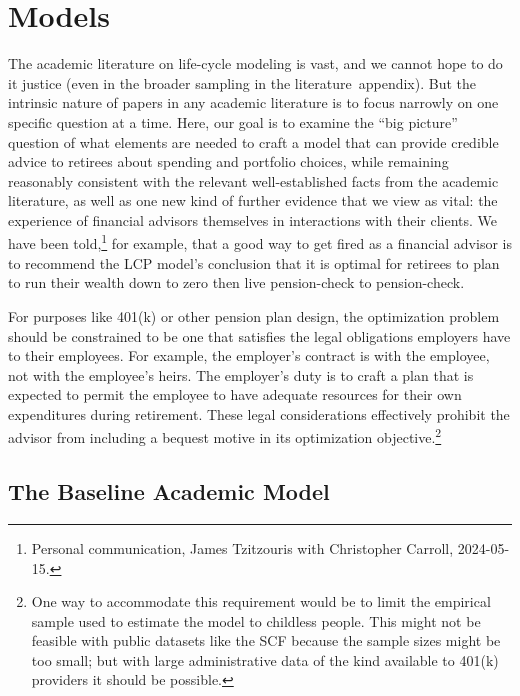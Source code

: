 \documentclass{article}
\begin{document}
\section{Models}

The academic literature on life-cycle modeling is vast, and we cannot hope to do it justice (even in the broader sampling in the literature~appendix).
But the intrinsic nature of papers in any academic literature is to focus narrowly on one specific question at a time.
Here, our goal is to examine the ``big picture'' question of what elements are needed to craft a model that can provide credible advice to retirees about spending and portfolio choices, while remaining reasonably consistent with the relevant well-established facts from the academic literature, as well as one new kind of further evidence that we view as vital: the experience of financial advisors themselves in interactions with their clients.
We have been told,\footnote{Personal communication, James Tzitzouris with Christopher Carroll, 2024-05-15.} for example, that a good way to get fired as a financial advisor is to recommend the LCP model's conclusion that it is optimal for retirees to plan to run their wealth down to zero then live pension-check to pension-check.

For purposes like 401(k) or other pension plan design, the optimization problem should be constrained to be one that satisfies the legal obligations employers have to their employees.
For example, the employer's contract is with the employee, not with the employee's heirs.
The employer's duty is to craft a plan that is expected to permit the employee to have adequate resources for their own expenditures during retirement.
These legal considerations effectively prohibit the advisor from including a bequest motive in its optimization objective.\footnote{One way to accommodate this requirement would be to limit the empirical sample used to estimate the model to childless people.
This might not be feasible with public datasets like the SCF because the sample sizes might be too small; but with large administrative data of the kind available to 401(k) providers it should be possible.}


\subsection{The Baseline Academic Model}
\end{document}
